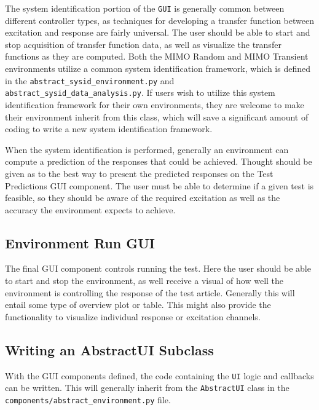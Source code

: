 \documentclass[pdf,12pt,report]{SANDreport}
\newcommand{\inlineCode}{\lstinline[basicstyle=\bfseries\ttfamily]}
\begin{document}
    The system identification portion of the \inlineCode{GUI} is generally common between different controller types, as techniques for developing a transfer function between excitation and response are fairly universal.  The user should be able to start and stop acquisition of transfer function data, as well as visualize the transfer functions as they are computed.  Both the \Ac{MIMO} Random and \Ac{MIMO} Transient environments utilize a common system identification framework, which is defined in the \inlineCode{abstract_sysid_environment.py} and \inlineCode{abstract_sysid_data_analysis.py}.  If users wish to utilize this system identification framework for their own environments, they are welcome to make their environment inherit from this class, which will save a significant amount of coding to write a new system identification framework.
    
    When the system identification is performed, generally an environment can compute a prediction of the responses that could be achieved.  Thought should be given as to the best way to present the predicted responses on the Test Predictions \ac{GUI} component.  The user must be able to determine if a given test is feasible, so they should be aware of the required excitation as well as the accuracy the environment expects to achieve.
    
    \subsection{Environment Run \ac{GUI}}
    
    The final \ac{GUI} component controls running the test.  Here the user should be able to start and stop the environment, as well receive a visual of how well the environment is controlling the response of the test article.  Generally this will entail some type of overview plot or table.  This might also provide the functionality to visualize individual response or excitation channels.
    
    \subsection{Writing an AbstractUI Subclass}
    
    With the \ac{GUI} components defined, the code containing the \inlineCode{UI} logic and callbacks can be written.  This will generally inherit from the \inlineCode{AbstractUI} class in the \inlineCode{components/abstract_environment.py} file.
    
\end{document}
